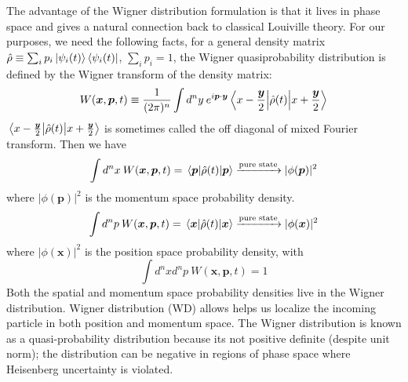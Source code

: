 The advantage of the Wigner distribution formulation is that it lives in phase space and gives a natural connection back to classical Louiville theory. For our purposes, we need the following facts, for a general density matrix $\hat{\rho} \equiv \sum_i p_i \ket{\psi_i(t)  } \bra{\psi_i (t)}$, $\sum_i p_i = 1$, the Wigner quasiprobability distribution is defined by the Wigner transform of the density matrix:
\begin{equation}
    W(\bm{x}, \bm{p}, t) \equiv \frac{1}{(2\pi)^n}   \int d^n y \: e^{i\bm{p} \cdot \bm{y}}  \mel{x  - \frac{\bm{y}}{2}}{\hat{\rho}(t)}{x  + \frac{\bm{y}}{2}}
\end{equation}
$\mel{x  - \frac{\bm{y}}{2}}{\hat{\rho}(t)}{x  + \frac{\bm{y}}{2}}$ is sometimes called the off diagonal of mixed Fourier transform. Then we have
\begin{equation}
    \int d^n x \: W(\bm{x}, \bm{p}, t) = \mel{\bm{p}}{\hat{\rho} (t)}{\bm{p}} \xrightarrow[]{\text{pure state}} |\phi (\bm{p})|^2
\end{equation}
where $|\phi (\bm{p})|^2$ is the momentum space probability density.
\begin{equation}
    \int d^n p \: W(\bm{x}, \bm{p}, t) = \mel{\bm{x}}{\hat{\rho} (t)}{\bm{x}} \xrightarrow[]{\text{pure state}} |\phi (\bm{x})|^2
\end{equation}
where $|\phi (\bm{x})|^2$ is the position space probability density, with
\begin{equation}
    \int d^n x d^n p \: W(\bm{x}, \bm{p}, t) = 1
\end{equation}
Both the spatial and momentum space probability densities live in the Wigner distribution. Wigner distribution (WD) allows helps us localize the incoming particle in both position and momentum space. The Wigner distribution is known as a quasi-probability distribution because its not positive definite (despite unit norm); the distribution can be negative in regions of phase space where Heisenberg uncertainty is violated. 

